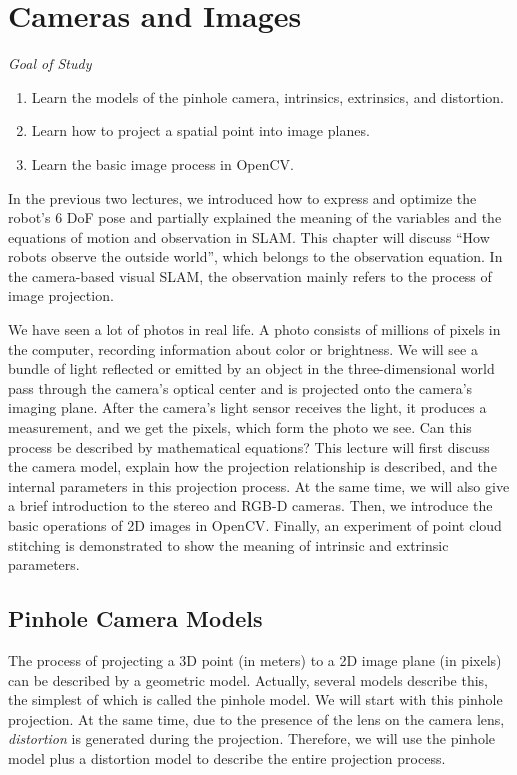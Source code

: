 \chapter{Cameras and Images}
\label{cpt:5}
\begin{mdframed}  
	\textit{Goal of Study}
	\begin{enumerate}[labelindent=0em,leftmargin=1.5em]
		\item Learn the models of the pinhole camera, intrinsics, extrinsics, and distortion. 
		\item Learn how to project a spatial point into image planes. 
		\item Learn the basic image process in OpenCV. 
	\end{enumerate}
\end{mdframed} 

In the previous two lectures, we introduced how to express and optimize the robot's 6 DoF pose and partially explained the meaning of the variables and the equations of motion and observation in SLAM. This chapter will discuss ``How robots observe the outside world'', which belongs to the observation equation. In the camera-based visual SLAM, the observation mainly refers to the process of image projection.

We have seen a lot of photos in real life. A photo consists of millions of pixels in the computer, recording information about color or brightness. We will see a bundle of light reflected or emitted by an object in the three-dimensional world pass through the camera's optical center and is projected onto the camera's imaging plane. After the camera's light sensor receives the light, it produces a measurement, and we get the pixels, which form the photo we see. Can this process be described by mathematical equations? This lecture will first discuss the camera model, explain how the projection relationship is described, and the internal parameters in this projection process. At the same time, we will also give a brief introduction to the stereo and RGB-D cameras. Then, we introduce the basic operations of 2D images in OpenCV. Finally, an experiment of point cloud stitching is demonstrated to show the meaning of intrinsic and extrinsic parameters.

\newpage

\newpage
\section{Pinhole Camera Models}
The process of projecting a 3D point (in meters) to a 2D image plane (in pixels) can be described by a geometric model. Actually, several models describe this, the simplest of which is called the pinhole model. We will start with this pinhole projection. At the same time, due to the presence of the lens on the camera lens, \textit{distortion} is generated during the projection. Therefore, we will use the pinhole model plus a distortion model to describe the entire projection process.

